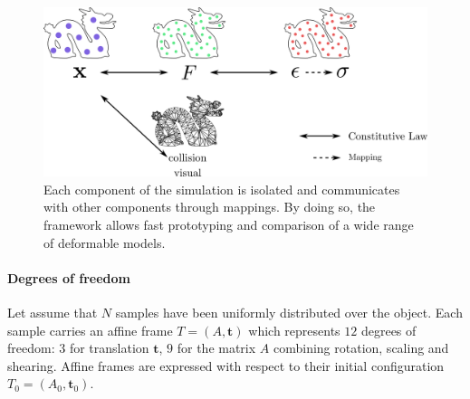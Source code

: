 \begin{figure}[H]
\centering
\includegraphics[width=\linewidth]{./images/continuum_mechanics/multiLayeredFramework.png}
\caption[STAR mechanics: Multi-layer framework]{\label{fig:multiLayerFramework} Each component of the simulation is isolated and communicates with other components through mappings. By doing so, the framework allows fast prototyping and comparison of a wide range of deformable models.}
\end{figure}

\paragraph{Degrees of freedom} Let assume that $N$ samples have been uniformly distributed over the object. 
Each sample carries an affine frame $T=(A,\mathbf{t})$ which represents $12$ degrees of freedom: $3$ for translation $\mathbf{t}$, $9$ for the matrix $A$ combining rotation, scaling and shearing. 
Affine frames are expressed with respect to their initial configuration~$T_{0} = \left(A_{0}, \mathbf{t}_{0}\right)$.

